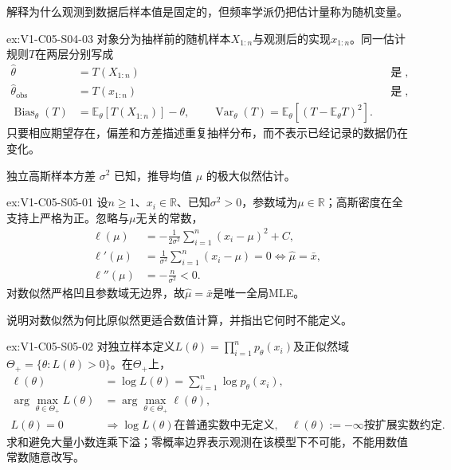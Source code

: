\begin{SLChapterExercisePairSection}
\begin{exercise}\label{ex:V1-C05-S04-03}
解释为什么观测到数据后样本值是固定的，但频率学派仍把估计量称为随机变量。
\end{exercise}
\label{sol:V1-C05-S04-03}
\begin{chapterexercisesolution}{ex:V1-C05-S04-03}
对象分为抽样前的随机样本$X_{1:n}$与观测后的实现$x_{1:n}$。同一估计规则$T$在两层分别写成
\[
\begin{aligned}
\widehat\theta&=T(X_{1:n})
&&\text{是随机变量},\\
\widehat\theta_{\mathrm{obs}}&=T(x_{1:n})
&&\text{是固定数值},\\
\operatorname{Bias}_\theta(T)
&=\mathbb E_\theta[T(X_{1:n})]-\theta,\qquad
\operatorname{Var}_\theta(T)=\mathbb E_\theta[(T-\mathbb E_\theta T)^2].
\end{aligned}
\]
只要相应期望存在，偏差和方差描述重复抽样分布，而不表示已经记录的数据仍在变化。
\end{chapterexercisesolution}

\begin{exercise}\label{ex:V1-C05-S05-01}
独立高斯样本方差 $\sigma^2$ 已知，推导均值 $\mu$ 的极大似然估计。
\end{exercise}
\label{sol:V1-C05-S05-01}
\begin{chapterexercisesolution}{ex:V1-C05-S05-01}
设$n\ge1$、$x_i\in\mathbb R$、已知$\sigma^2>0$，参数域为$\mu\in\mathbb R$；高斯密度在全支持上严格为正。忽略与$\mu$无关的常数，
\[
\begin{aligned}
\ell(\mu)
&=-\frac1{2\sigma^2}\sum_{i=1}^n(x_i-\mu)^2+C,\\
\ell'(\mu)
&=\frac1{\sigma^2}\sum_{i=1}^n(x_i-\mu)=0
\Longleftrightarrow \widehat\mu=\bar x,\\
\ell''(\mu)&=-\frac n{\sigma^2}<0.
\end{aligned}
\]
对数似然严格凹且参数域无边界，故$\widehat\mu=\bar x$是唯一全局MLE。
\end{chapterexercisesolution}

\begin{exercise}\label{ex:V1-C05-S05-02}
说明对数似然为何比原似然更适合数值计算，并指出它何时不能定义。
\end{exercise}
\label{sol:V1-C05-S05-02}
\begin{chapterexercisesolution}{ex:V1-C05-S05-02}
对独立样本定义$L(\theta)=\prod_{i=1}^np_\theta(x_i)$及正似然域$\Theta_+=\{\theta:L(\theta)>0\}$。在$\Theta_+$上，
\[
\begin{aligned}
\ell(\theta)
&=\log L(\theta)
=\sum_{i=1}^n\log p_\theta(x_i),\\
\arg\max_{\theta\in\Theta_+}L(\theta)
&=\arg\max_{\theta\in\Theta_+}\ell(\theta),\\
L(\theta)=0
&\Longrightarrow \log L(\theta)\text{在普通实数中无定义},
\quad \ell(\theta):=-\infty\text{按扩展实数约定}.
\end{aligned}
\]
求和避免大量小数连乘下溢；零概率边界表示观测在该模型下不可能，不能用数值常数随意改写。
\end{chapterexercisesolution}


\end{SLChapterExercisePairSection}

